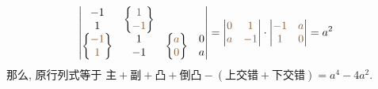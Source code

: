 \begin{solution}
\begin{align*}
\begin{vmatrix}
\begin{matrix}
-1\\
1
\end{matrix} & \begin{Bmatrix}
\textcolor[rgb]{0.55,0.34,0.16}{1}\\
\textcolor[rgb]{0.55,0.34,0.16}{-1}
\end{Bmatrix}\\
\begin{Bmatrix}
\textcolor[rgb]{0.55,0.34,0.16}{-1}\\
\textcolor[rgb]{0.55,0.34,0.16}{1}
\end{Bmatrix} & \begin{matrix}
1\\
-1
\end{matrix} & \begin{Bmatrix}
\textcolor[rgb]{0.55,0.34,0.16}{a}\\
\textcolor[rgb]{0.55,0.34,0.16}{0}
\end{Bmatrix} & \begin{matrix}
0\\
a
\end{matrix}
\end{vmatrix} =\begin{vmatrix}
\textcolor[rgb]{0.55,0.34,0.16}{0} & \textcolor[rgb]{0.55,0.34,0.16}{1}\\
\textcolor[rgb]{0.55,0.34,0.16}{a} & \textcolor[rgb]{0.55,0.34,0.16}{-1}
\end{vmatrix} \cdot \begin{vmatrix}
\textcolor[rgb]{0.55,0.34,0.16}{-1} & \textcolor[rgb]{0.55,0.34,0.16}{a}\\
\textcolor[rgb]{0.55,0.34,0.16}{1} & \textcolor[rgb]{0.55,0.34,0.16}{0}
\end{vmatrix} =a^{2}
        \end{align*}
    那么, 原行列式等于 $\text{主}+\text{副}+\text{凸}+\text{倒凸}-(\text{上交错}+\text{下交错})=a^4-4a^2.$
\end{solution}


